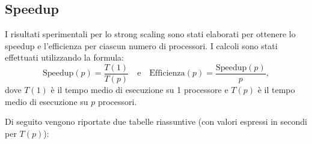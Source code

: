 \documentclass[letterpaper,11pt,leqno]{article}
\begin{document}
\subsection{Speedup}

I risultati sperimentali per lo strong scaling sono stati elaborati per ottenere lo speedup e l'efficienza per ciascun numero di processori. I calcoli sono stati effettuati utilizzando la formula:
\[
\text{Speedup}(p) = \frac{T(1)}{T(p)} \quad\text{e}\quad \text{Efficienza}(p) = \frac{\text{Speedup}(p)}{p},
\]
dove \(T(1)\) è il tempo medio di esecuzione su 1 processore e \(T(p)\) è il tempo medio di esecuzione su \(p\) processori.

Di seguito vengono riportate due tabelle riassuntive (con valori espressi in secondi per \(T(p)\)):
\end{document}
